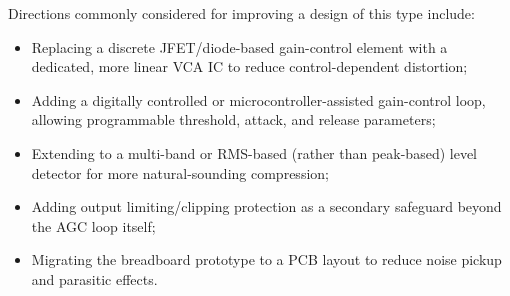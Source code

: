 Directions commonly considered for improving a design of this type include:
\begin{itemize}
    \item Replacing a discrete JFET/diode-based gain-control element with a dedicated, more linear VCA IC to reduce control-dependent distortion;
    \item Adding a digitally controlled or microcontroller-assisted gain-control loop, allowing programmable threshold, attack, and release parameters;
    \item Extending to a multi-band or RMS-based (rather than peak-based) level detector for more natural-sounding compression;
    \item Adding output limiting/clipping protection as a secondary safeguard beyond the AGC loop itself;
    \item Migrating the breadboard prototype to a PCB layout to reduce noise pickup and parasitic effects.
\end{itemize}
